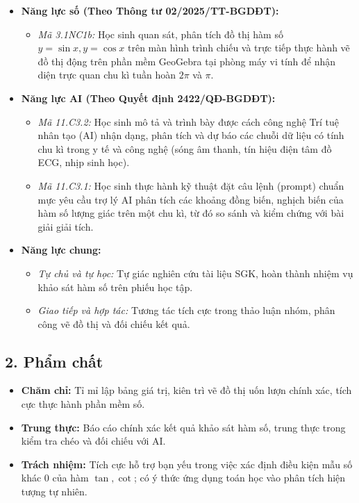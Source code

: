 \documentclass[12pt, a4paper]{article}
\begin{document}
\begin{itemize}[leftmargin=1.2cm]
    \item \textbf{Năng lực số (Theo Thông tư 02/2025/TT-BGDĐT):}
    \begin{itemize}[leftmargin=0.6cm]
        \item \textit{Mã 3.1NC1b:} Học sinh quan sát, phân tích đồ thị hàm số $y = \sin x, y = \cos x$ trên màn hình trình chiếu và trực tiếp thực hành vẽ đồ thị động trên phần mềm GeoGebra tại phòng máy vi tính để nhận diện trực quan chu kì tuần hoàn $2\pi$ và $\pi$.
    \end{itemize}

    \item \textbf{Năng lực AI (Theo Quyết định 2422/QĐ-BGDĐT):}
    \begin{itemize}[leftmargin=0.6cm]
        \item \textit{Mã 11.C3.2:} Học sinh mô tả và trình bày được cách công nghệ Trí tuệ nhân tạo (AI) nhận dạng, phân tích và dự báo các chuỗi dữ liệu có tính chu kì trong y tế và công nghệ (sóng âm thanh, tín hiệu điện tâm đồ ECG, nhịp sinh học).
        \item \textit{Mã 11.C3.1:} Học sinh thực hành kỹ thuật đặt câu lệnh (prompt) chuẩn mực yêu cầu trợ lý AI phân tích các khoảng đồng biến, nghịch biến của hàm số lượng giác trên một chu kì, từ đó so sánh và kiểm chứng với bài giải giải tích.
    \end{itemize}

    \item \textbf{Năng lực chung:}
    \begin{itemize}[leftmargin=0.6cm]
        \item \textit{Tự chủ và tự học:} Tự giác nghiên cứu tài liệu SGK, hoàn thành nhiệm vụ khảo sát hàm số trên phiếu học tập.
        \item \textit{Giao tiếp và hợp tác:} Tương tác tích cực trong thảo luận nhóm, phân công vẽ đồ thị và đối chiếu kết quả.
    \end{itemize}
\end{itemize}

\subsection*{2. Phẩm chất}

\begin{itemize}[leftmargin=1.2cm]
    \item \textbf{Chăm chỉ:} Tỉ mỉ lập bảng giá trị, kiên trì vẽ đồ thị uốn lượn chính xác, tích cực thực hành phần mềm số.
    \item \textbf{Trung thực:} Báo cáo chính xác kết quả khảo sát hàm số, trung thực trong kiểm tra chéo và đối chiếu với AI.
    \item \textbf{Trách nhiệm:} Tích cực hỗ trợ bạn yếu trong việc xác định điều kiện mẫu số khác 0 của hàm $\tan, \cot$; có ý thức ứng dụng toán học vào phân tích hiện tượng tự nhiên.
\end{itemize}
\end{document}

